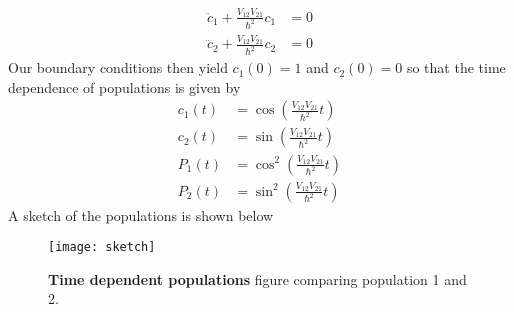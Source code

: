\documentclass[a4paper, 11pt]{article}
\newenvironment{solution}{%
	\begin{list}{}{%
			\setlength{\topsep}{0pt}%
			\setlength{\leftmargin}{0.5cm}%
			\setlength{\rightmargin}{0.5cm}%
			\setlength{\listparindent}{\parindent}%
			\setlength{\itemindent}{\parindent}%
			\setlength{\parsep}{\parskip}%
		}%
		\item[]}{\end{list}}
\begin{document}
\begin{enumerate}[leftmargin=0em, label=\textbf{\arabic*}]
\begin{solution}
      \begin{align}
        \ddot c_1 + \frac{V_{12}V_{21}}{\hbar^2}c_1 &= 0 \\
        \ddot c_2 + \frac{V_{12}V_{21}}{\hbar^2}c_2 &= 0 
      \end{align}
      Our boundary conditions then yield $c_1(0)=1$ and $c_2(0)=0$ so that the
      time dependence of populations is given by
      \begin{align}
        c_1(t) &= \cos\left(\frac{V_{12}V_{21}}{\hbar^2}t\right) \\ 
        c_2(t) &= \sin\left(\frac{V_{12}V_{21}}{\hbar^2}t\right) \\ 
        P_1(t) &= \cos^2\left(\frac{V_{12}V_{21}}{\hbar^2}t\right) \\ 
        P_2(t) &= \sin^2\left(\frac{V_{12}V_{21}}{\hbar^2}t\right) 
      \end{align}
      A sketch of the populations is shown below
      \begin{figure}[!hbt]
        \centering
        \texttt{[image: sketch]}
        \caption{\textbf{Time dependent populations} figure comparing population
        1 and 2.}
      \end{figure}
      

    \end{solution}
    


\end{enumerate}

  
\end{document}
